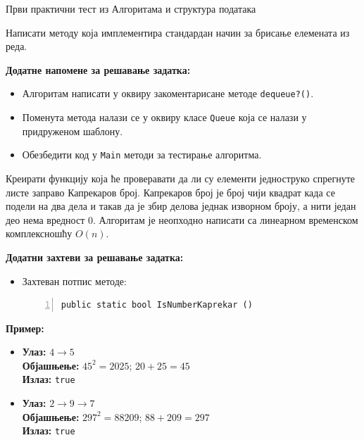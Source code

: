 
Први практични тест из Алгоритама и структура података

Написати методу која имплементира стандардан начин за брисање елемената из реда.

\textbf{Додатне напомене за решавање задатка:}
\begin{itemize}
    \item Алгоритам написати у оквиру закоментарисане методе \texttt{dequeue?()}.
    \item Поменута метода налази се у оквиру класе \texttt{Queue} која се налази у придруженом шаблону.
    \item Обезбедити код у \texttt{Main} методи за тестирање алгоритма.
\end{itemize}



Креирати функцију која ће проверавати да ли су елементи једноструко спрегнуте листе заправо Капрекаров број. Капрекаров број је број чији квадрат када се подели на два дела и такав да је збир делова једнак изворном броју, а нити један део нема вредност 0. Алгоритам је неопходно написати са линеарном временском комплексношћу $O(n)$.

\textbf{Додатни захтеви за решавање задатка:}
\begin{itemize}
    \item Захтеван потпис методе:
    \begin{Verbatim}[fontsize=\footnotesize, numbers=left, xleftmargin=10mm]
public static bool IsNumberKaprekar ()
    \end{Verbatim}
\end{itemize}

\textbf{Пример:}
\begin{itemize}
    \item \textbf{Улаз:} $4 \rightarrow 5$ \\
          \textbf{Објашњење:} $45^2 = 2025$; $20 + 25 = 45$ \\
          \textbf{Излаз:} \texttt{true}
    \item \textbf{Улаз:} $2 \rightarrow 9 \rightarrow 7$ \\
          \textbf{Објашњење:} $297^2 = 88209$; $88 + 209 = 297$ \\
          \textbf{Излаз:} \texttt{true}
\end{itemize}




